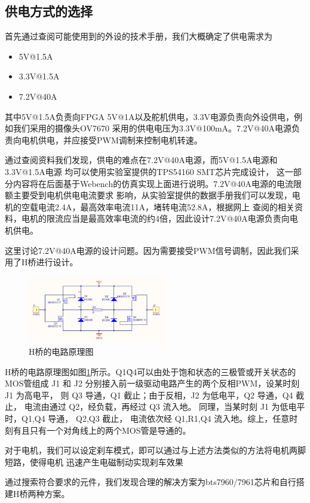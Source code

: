 \documentclass[a4paper]{paper}
\begin{document}
\subsection{供电方式的选择}
首先通过查阅可能使用到的外设的技术手册，我们大概确定了供电需求为
\begin{itemize}
    \item 5V@1.5A
    \item 3.3V@1.5A
    \item 7.2V@40A
\end{itemize}
其中5V@1.5A负责向FPGA 5V@1A以及舵机供电，3.3V电源负责向外设供电，例如我们采用的摄像头OV7670
采用的供电电压为3.3V@100mA。7.2V@40A电源负责向电机供电，并应接受PWM调制来控制电机转速。

通过查阅资料我们发现，供电的难点在7.2V@40A电源，而5V@1.5A电源和3.3V@1.5A电源
均可以使用实验室提供的TPS54160 SMT芯片完成设计，
这一部分内容将在后面基于Webench的仿真实现上面进行说明。7.2V@40A电源的电流限额主要受到电机供电电流要求
影响，从实验室提供的数据手册我们可以发现，电机的空载电流2.4A，最高效率电流11A，堵转电流52.8A，根据网上
查阅的相关资料，电机的限流应当是最高效率电流的约4倍，因此设计7.2V@40A电源负责向电机供电。

这里讨论7.2V@40A电源的设计问题。因为需要接受PWM信号调制，因此我们采用了H桥进行设计。
\begin{figure}
    \centering
    \includegraphics[width=60mm]{../preview/HBridge.jpg}
    \caption{H桥的电路原理图}
    \label{H-bridge}
\end{figure}
H桥的电路原理图如图\ref{H-bridge}所示。Q1\~Q4可以由处于饱和状态的三极管或开关状态的MOS管组成 
J1 和 J2 分别接入前一级驱动电路产生的两个反相PWM，设某时刻 J1 为高电平，
则 Q3 导通，Q1 截止；由于反相，J2 为低电平，Q2 导通，Q4 截止，
电流由通过 Q2，经负载，再经过 Q3 流入地。
同理，当某时刻 J1 为低电平时，Q1,Q4 导通， Q2,Q3 截止，
电流依次经 Q1,R1,Q4 流入地。综上，任意时刻有且只有一个对角线上的两个MOS管是导通的。

对于电机，我们可以设定刹车模式，即可以通过与上述方法类似的方法将电机两脚短路，使得电机
迅速产生电磁制动实现刹车效果

通过搜索符合要求的元件，我们发现合理的解决方案为bts7960/7961芯片和自行搭建H桥两种方案。
\end{document}
